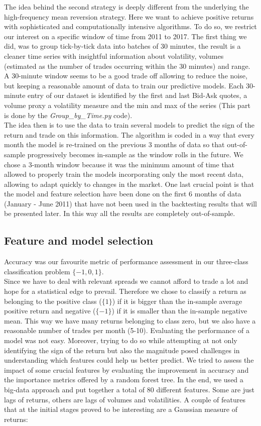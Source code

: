 \documentclass[a4paper]{article}
\begin{document}
The idea behind the second strategy is deeply different from the underlying the high-frequency mean reversion strategy. Here we want to achieve positive returns with sophisticated and computationally intensive algorithms. To do so, we restrict our interest on a specific window of time from 2011 to 2017. The first thing we did, was to group tick-by-tick data into batches of 30 minutes, the result is a cleaner time series with insightful information about volatility, volumes (estimated as the number of trades occurring within the 30 minutes) and range. A 30-minute window seems to be a good trade off allowing to reduce the noise, but keeping a reasonable amount of data to train our predictive models. Each 30-minute entry of our dataset is identified by the first and last Bid-Ask quotes, a volume proxy a volatility measure and the min and max of the series (This part is done by the \textit{Group\_by\_Time.py} code).\\
The idea then is to use the data to train several models to predict the sign of the return and trade on this information. The algorithm is coded in a way that every month the model is re-trained on the previous 3 months of data so that out-of-sample progressively becomes in-sample as the window rolls in the future. We chose a 3-month window because it was the minimum amount of time that allowed to properly train the models incorporating only the most recent data, allowing to adapt quickly to changes in the market. One last crucial point is that the model and feature selection have been done on the first 6 months of data (January - June 2011) that have not been used in the backtesting results that will be presented later. In this way all the results are completely out-of-sample.

\subsection{Feature and model selection}

Accuracy was our favourite metric of performance assessment in our three-class classification problem $\{-1,0,1\}$.\\ Since we have to deal with relevant spreads we cannot afford to trade a lot and hope for a statistical edge to prevail. Therefore we chose to classify a return as belonging to the positive class ($\{1\}$) if it is bigger than the in-sample average positive return and negative ($\{-1\}$) if it is smaller than the in-sample negative mean. This way we have many returns belonging to class zero, but we also have a reasonable number of trades per month (5-10). Evaluating the performance of a model was not easy. Moreover, trying to do so while attempting at not only identifying the sign of the return but also the magnitude posed challenges in understanding which features could help us better predict. We tried to assess the impact of some crucial features by evaluating the improvement in accuracy and the importance metrics offered by a random forest tree. In the end, we used a big-data approach and put together a total of 80 different features. Some are just lags of returns, others are lags of volumes and volatilities. A couple of features that at the initial stages proved to be interesting are a Gaussian measure of returns:
\end{document}
